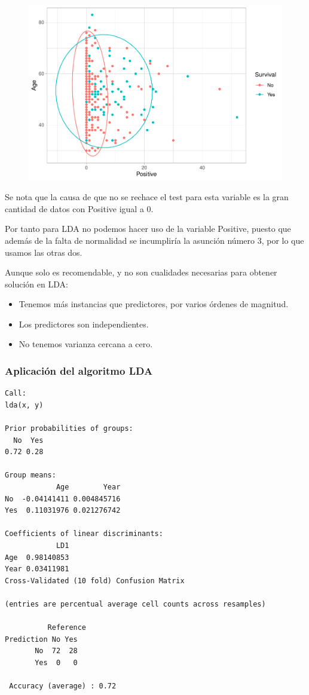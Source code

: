 \begin{figure}[H]\center\includegraphics[width=.8\linewidth]{img/Clasificacion_files/figure-latex/unnamed-chunk-20-3}\caption{}\end{figure}

Se nota que la causa de que no se rechace el test para esta variable es la gran cantidad de datos con Positive igual a 0.

\vspace{\baselineskip}

Por tanto para LDA no podemos hacer uso de la variable Positive, puesto que además de la falta de normalidad se incumpliría la asunción número 3, por lo que usamos las otras dos.

\vspace{\baselineskip}

Aunque solo es recomendable, y no son cualidades necesarias para obtener solución en LDA:
\begin{itemize}
    \item Tenemos más instancias que predictores, por varios órdenes de magnitud.
    \item Los predictores son independientes. 
    \item No tenemos varianza cercana a cero.
\end{itemize}

\subsubsection{Aplicación del algoritmo LDA}

\begin{verbatim}
Call:
lda(x, y)

Prior probabilities of groups:
  No  Yes 
0.72 0.28 

Group means:
            Age        Year
No  -0.04141411 0.004845716
Yes  0.11031976 0.021276742

Coefficients of linear discriminants:
            LD1
Age  0.98140853
Year 0.03411981
Cross-Validated (10 fold) Confusion Matrix 

(entries are percentual average cell counts across resamples)
 
          Reference
Prediction No Yes
       No  72  28
       Yes  0   0
                          
 Accuracy (average) : 0.72
\end{verbatim}


